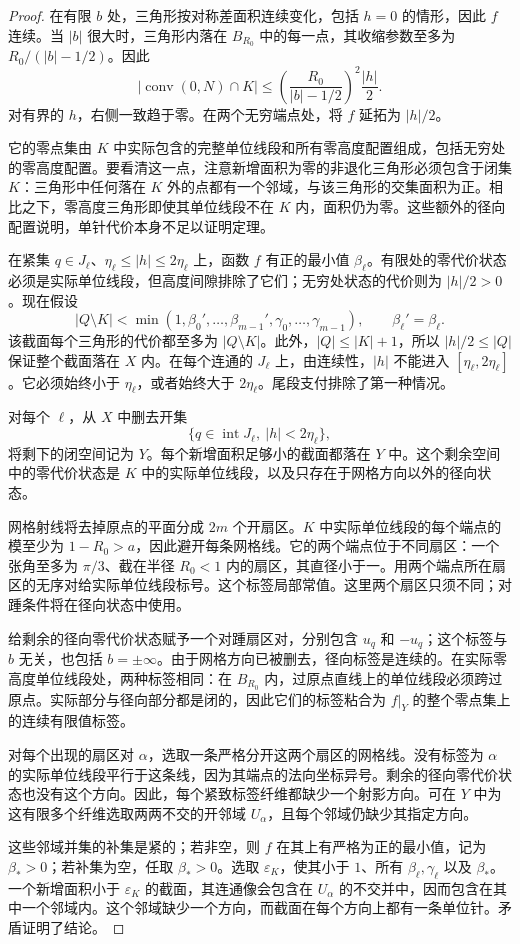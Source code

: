 \begin{proof}
在有限 $b$ 处，三角形按对称差面积连续变化，包括 $h=0$ 的情形，因此 $f$ 连续。当 $|b|$ 很大时，三角形内落在 $B_{R_0}$ 中的每一点，其收缩参数至多为 $R_0/(|b|-1/2)$。因此
\[
 |\operatorname{conv}(0,N)\cap K|
 \le \left(\frac{R_0}{|b|-1/2}\right)^2\frac{|h|}{2}.
\]
对有界的 $h$，右侧一致趋于零。在两个无穷端点处，将 $f$ 延拓为 $|h|/2$。

它的零点集由 $K$ 中实际包含的完整单位线段和所有零高度配置组成，包括无穷处的零高度配置。要看清这一点，注意新增面积为零的非退化三角形必须包含于闭集 $K$：三角形中任何落在 $K$ 外的点都有一个邻域，与该三角形的交集面积为正。相比之下，零高度三角形即使其单位线段不在 $K$ 内，面积仍为零。这些额外的径向配置说明，单针代价本身不足以证明定理。

在紧集 $q\in J_\ell$、$\eta_\ell\le|h|\le2\eta_\ell$ 上，函数 $f$ 有正的最小值 $\beta_\ell$。有限处的零代价状态必须是实际单位线段，但高度间隙排除了它们；无穷处状态的代价则为 $|h|/2>0$。现在假设
\[
 |Q\setminus K|<\min(1,\beta_0',\ldots,\beta_{m-1}',
                                \gamma_0,\ldots,\gamma_{m-1}),
 \qquad \beta_\ell'=\beta_\ell.
\]
该截面每个三角形的代价都至多为 $|Q\setminus K|$。此外，$|Q|\le |K|+1$，所以 $|h|/2\le |Q|$ 保证整个截面落在 $X$ 内。在每个连通的 $J_\ell$ 上，由连续性，$|h|$ 不能进入 $[\eta_\ell,2\eta_\ell]$。它必须始终小于 $\eta_\ell$，或者始终大于 $2\eta_\ell$。尾段支付排除了第一种情况。

对每个 $\ell$，从 $X$ 中删去开集
\[
 \{q\in\operatorname{int}J_\ell,\ |h|<2\eta_\ell\},
\]
将剩下的闭空间记为 $Y$。每个新增面积足够小的截面都落在 $Y$ 中。这个剩余空间中的零代价状态是 $K$ 中的实际单位线段，以及只存在于网格方向以外的径向状态。

网格射线将去掉原点的平面分成 $2m$ 个开扇区。$K$ 中实际单位线段的每个端点的模至少为 $1-R_0>a$，因此避开每条网格线。它的两个端点位于不同扇区：一个张角至多为 $\pi/3$、截在半径 $R_0<1$ 内的扇区，其直径小于一。用两个端点所在扇区的无序对给实际单位线段标号。这个标签局部常值。这里两个扇区只须不同；对踵条件将在径向状态中使用。

给剩余的径向零代价状态赋予一个对踵扇区对，分别包含 $u_q$ 和 $-u_q$；这个标签与 $b$ 无关，也包括 $b=\pm\infty$。由于网格方向已被删去，径向标签是连续的。在实际零高度单位线段处，两种标签相同：在 $B_{R_0}$ 内，过原点直线上的单位线段必须跨过原点。实际部分与径向部分都是闭的，因此它们的标签粘合为 $f|_Y$ 的整个零点集上的连续有限值标签。

对每个出现的扇区对 $\alpha$，选取一条严格分开这两个扇区的网格线。没有标签为 $\alpha$ 的实际单位线段平行于这条线，因为其端点的法向坐标异号。剩余的径向零代价状态也没有这个方向。因此，每个紧致标签纤维都缺少一个射影方向。可在 $Y$ 中为这有限多个纤维选取两两不交的开邻域 $U_\alpha$，且每个邻域仍缺少其指定方向。

这些邻域并集的补集是紧的；若非空，则 $f$ 在其上有严格为正的最小值，记为 $\beta_*>0$；若补集为空，任取 $\beta_*>0$。选取 $\varepsilon_K$，使其小于 $1$、所有 $\beta_\ell,\gamma_\ell$ 以及 $\beta_*$。一个新增面积小于 $\varepsilon_K$ 的截面，其连通像会包含在 $U_\alpha$ 的不交并中，因而包含在其中一个邻域内。这个邻域缺少一个方向，而截面在每个方向上都有一条单位针。矛盾证明了结论。
\end{proof}

